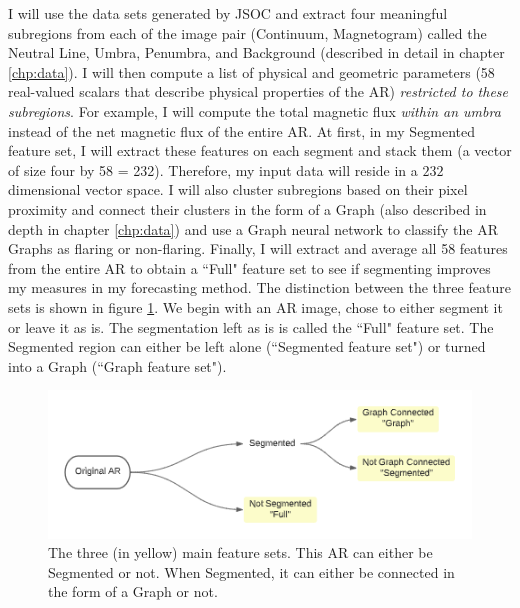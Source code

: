 \documentclass[defaultstyle,11pt]{thesis}
\begin{document}
I will use the data sets generated by JSOC and extract four meaningful subregions from each of the image pair (Continuum, Magnetogram) called the Neutral Line, Umbra, Penumbra, and Background (described in detail in chapter \ref{chp:data}). I will then compute a list of physical and geometric parameters (58 real-valued scalars that describe physical properties of the AR) \textit{restricted to these subregions}. For example, I will compute the total magnetic flux \textit{within an umbra} instead of the net magnetic flux of the entire AR. At first, in my Segmented feature set, I will extract these features on each segment and stack them (a vector of size four by 58 = 232). Therefore, my input data will reside in a $232$ dimensional vector space. I will also cluster subregions based on their pixel proximity and connect their clusters in the form of a Graph (also described in depth in chapter \ref{chp:data}) and use a Graph neural network to classify the AR Graphs as flaring or non-flaring. Finally, I will extract and average all 58 features from the entire AR to obtain a ``Full" feature set to see if segmenting improves my measures in my forecasting method. The distinction between the three feature sets is shown in figure \ref{fig:pipeline}. We begin with an AR image, chose to either segment it or leave it as is. The segmentation left as is is called the ``Full" feature set. The Segmented region can either be left alone (``Segmented feature set") or turned into a Graph (``Graph feature set").
\begin{figure}[h]
    \centering
    \includegraphics[width=0.8\linewidth]{ThesisFilePkg/figures/data/pipeline.png}
    \caption{The three (in yellow) main feature sets. This AR can either be Segmented or not. When Segmented, it can either be connected in the form of a Graph or not.}
    \label{fig:pipeline}
\end{figure}
\end{document}
